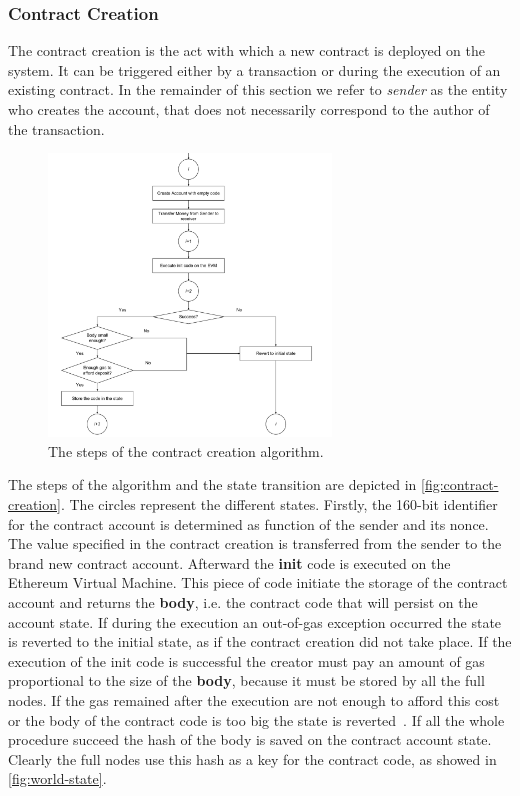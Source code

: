 \subsubsection{Contract Creation}
The contract creation is the act with which a new contract is deployed
on the system. It can be triggered either by a transaction or during the 
execution of an existing contract. In the remainder of this section we refer
to \textit{sender} as the entity who creates the account, that does not 
necessarily correspond to the author of the transaction.

\begin{figure}
	\begin{center}
		\includegraphics[width=0.67\textwidth]{./res/img/contract-creation.pdf}
	\end{center}
	\caption{The steps of the contract creation algorithm.}
	\label{fig:contract-creation}
\end{figure}

The steps of the algorithm and the state transition are depicted in
\autoref{fig:contract-creation}. The circles represent the different states.
Firstly, the 160-bit identifier for the contract account is determined as
function of the sender and its nonce. The value specified in the contract
creation is transferred from the sender to the brand new contract account.
Afterward the \textbf{init} code is executed on the Ethereum Virtual Machine.
This  piece of code initiate the storage of the contract account and returns the
\textbf{body}, i.e. the contract code that will persist on the account state.
If during the execution an out-of-gas exception occurred the state is reverted
to the initial state, as if the contract creation did not take place.
If the execution of the init code is successful the creator must pay an amount
of gas proportional to the size of the \textbf{body}, because it must be
stored by all the full nodes. If the gas remained after the execution are not
enough to afford this cost or the body of the contract code is too big the
state is reverted~\cite{wood2018ethereum}.
If all the whole procedure succeed the hash of the body is saved on the
contract account state. Clearly the full nodes use this hash as a key for the 
contract code, as showed in \autoref{fig:world-state}.
 
